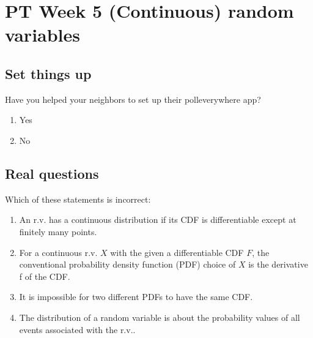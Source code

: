 \documentclass[poll_tutorial_format]{subfiles}
\begin{document}
	\maketitle
	
	\setcounter{section}{4}
	\section{PT Week 5 (Continuous) random variables}
	
	\subsection{Set things up}
	\label{sec:set-things-up}
	
	
	
	\setcounter{theorem}{-1}
	\begin{exercise}
		Have you helped your neighbors to set up their polleverywhere app? 
		\begin{enumerate}
			\item Yes
			\item No
		\end{enumerate}
	\end{exercise}
	
	\subsection{Real questions}
	\label{sec:start-real-questions pt week 5}
	
		
	
 
	
	
	\begin{exercise}
		Which of these statements is incorrect: 
		\begin{enumerate}
			\item An r.v. has a continuous distribution if its CDF is differentiable except at finitely many points.    
			\item For a continuous r.v. $X$ with the given a differentiable CDF
			$F$, the conventional probability density function (PDF) choice of $X$ is the derivative f of the CDF.
			\item It is impossible for two different PDFs to have the same CDF.
			\item The distribution of a random variable is about the probability values of all events associated with the r.v..
		\end{enumerate}
	\end{exercise}
	
\end{document}
